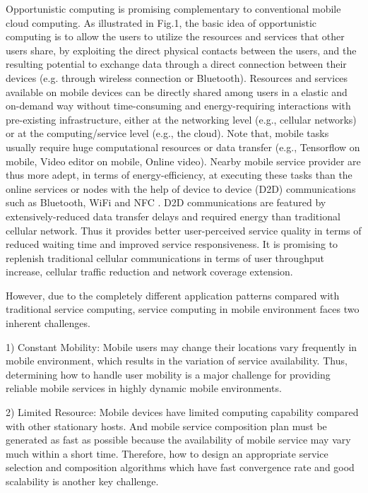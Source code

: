 \documentclass[10pt,journal,compsoc]{IEEEtran}
\begin{document}
Opportunistic computing is promising complementary to conventional mobile cloud computing. As illustrated in Fig.1, the basic idea of opportunistic computing is to allow the users to utilize the resources and services that other users share, by exploiting the direct physical contacts between the users, and the resulting potential to exchange data through a direct connection between their devices (e.g. through wireless connection or Bluetooth). Resources and services available on mobile devices can be directly shared among users in a elastic and on-demand way without time-consuming and energy-requiring interactions with pre-existing infrastructure, either at the networking level (e.g., cellular networks) or at the computing/service level (e.g., the cloud). 
Note that, mobile tasks usually require huge computational resources or data transfer (e.g., Tensorflow on mobile, Video editor on mobile, Online video). Nearby mobile service provider are thus more adept, in terms of energy-efficiency, at executing these tasks than the online services or nodes with the help of device
to device (D2D) communications such as Bluetooth, WiFi and NFC \cite{balani2007energy}. D2D communications are featured by extensively-reduced data transfer delays and required energy than traditional cellular network. Thus it provides better user-perceived service quality in terms of reduced waiting time and improved service responsiveness. It is promising to replenish traditional cellular communications in terms of user throughput increase, cellular traffic reduction and network coverage extension. 

However, due to the completely different application patterns compared with traditional service computing, service computing in mobile environment faces two inherent challenges.

1) Constant Mobility: Mobile users may change their locations vary frequently in mobile environment, which results in the variation of service availability. Thus, determining how to handle user mobility is a major challenge for providing reliable mobile services in highly dynamic mobile environments.

2) Limited Resource: Mobile devices have limited computing capability compared with other stationary hosts. And mobile service composition plan must be generated as fast as possible because the availability of mobile service may vary much within a short time. Therefore, how to design an appropriate service selection and composition algorithms which have fast convergence rate and good scalability is another key challenge.
\end{document}
